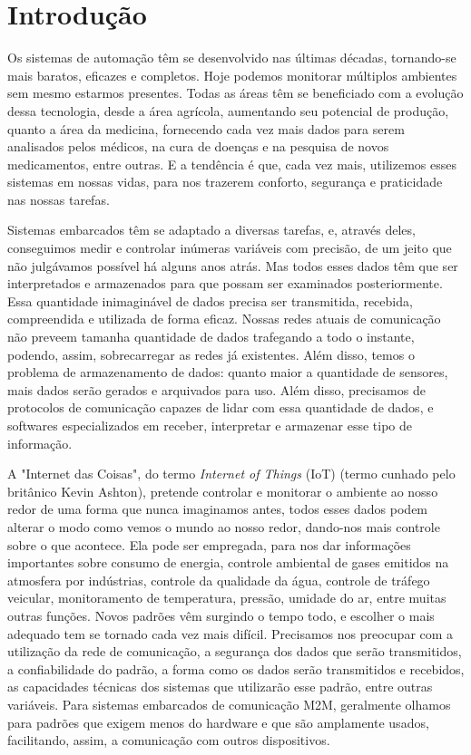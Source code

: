 \chapter{Introdução}
\label{chap:Introducao}

	Os sistemas de automação têm se desenvolvido nas últimas décadas, tornando-se mais baratos, eficazes e completos. Hoje podemos monitorar múltiplos ambientes sem mesmo estarmos presentes. Todas as áreas têm se beneficiado com a evolução dessa tecnologia, desde a área agrícola, aumentando seu potencial de produção, quanto a área da medicina, fornecendo cada vez mais dados para serem analisados pelos médicos, na cura de doenças e na pesquisa de novos medicamentos, entre outras. E a tendência é que, cada vez mais, utilizemos esses sistemas em nossas vidas, para nos trazerem conforto, segurança e praticidade nas nossas tarefas.
	
	Sistemas embarcados têm se adaptado a diversas tarefas, e, através deles, conseguimos medir e controlar inúmeras variáveis com precisão, de um jeito que não julgávamos possível há alguns anos atrás. Mas todos esses dados têm que ser interpretados e armazenados para que possam ser examinados posteriormente. Essa quantidade inimaginável de dados precisa ser transmitida, recebida, compreendida e utilizada de forma eficaz. Nossas redes atuais de comunicação não preveem tamanha quantidade de dados trafegando a todo o instante, podendo, assim, sobrecarregar as redes já existentes. Além disso, temos o problema de armazenamento de dados: quanto maior a quantidade de sensores, mais dados serão gerados e arquivados para uso. Além disso, precisamos de protocolos de comunicação capazes de lidar com essa quantidade de dados, e softwares especializados em receber, interpretar e armazenar esse tipo de informação.
	
	A "Internet das Coisas", do termo \textit{Internet of Things} (IoT) (termo cunhado pelo britânico Kevin Ashton), pretende controlar e monitorar o ambiente ao nosso redor de uma forma que nunca imaginamos antes, todos esses dados podem alterar o modo como vemos o mundo ao nosso redor, dando-nos mais controle sobre o que acontece. Ela pode ser empregada, para nos dar informações importantes sobre consumo de energia, controle ambiental de gases emitidos na atmosfera por indústrias, controle da qualidade da água, controle de tráfego veicular, monitoramento de temperatura, pressão, umidade do ar, entre muitas outras funções. Novos padrões vêm surgindo o tempo todo, e escolher o mais adequado tem se tornado cada vez mais difícil. Precisamos nos preocupar com a utilização da rede de comunicação, a segurança dos dados que serão transmitidos, a confiabilidade do padrão, a forma como os dados serão transmitidos e recebidos, as capacidades técnicas dos sistemas que utilizarão esse padrão, entre outras variáveis. Para sistemas embarcados de comunicação M2M, geralmente olhamos para padrões que exigem menos do hardware e que são amplamente usados, facilitando, assim, a comunicação com outros dispositivos.
	
